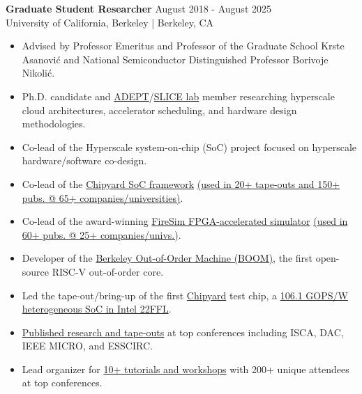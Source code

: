 \documentclass[line]{res}
\begin{document}
\begin{resume}
\textbf{Graduate Student Researcher} \hfill August 2018 - August 2025
\\
University of California, Berkeley | Berkeley, CA
\\
\vspace{-3mm}
\begin{itemize}
\item Advised by Professor Emeritus and Professor of the Graduate School Krste Asanovi\'c and National Semiconductor Distinguished Professor Borivoje Nikoli\'c.
\item Ph.D. candidate and \href{https://adept.eecs.berkeley.edu/}{ADEPT}/\href{https://slice.eecs.berkeley.edu/}{SLICE lab} member researching hyperscale cloud architectures, accelerator scheduling, and hardware design methodologies.
\item Co-lead of the Hyperscale system-on-chip (SoC) project focused on hyperscale hardware/software co-design.
\item Co-lead of the \href{https://github.com/ucb-bar/chipyard}{Chipyard SoC framework} \href{https://scholar.google.com/scholar?cites=4549882523608568335&as_sdt=2005&sciodt=0,5&hl=en}{(used in 20+ tape-outs and 150+ pubs. @ 65+ companies/universities)}.
\item Co-lead of the award-winning \href{https://fires.im/}{FireSim FPGA-accelerated simulator} \href{https://fires.im/publications/#userpapers}{(used in 60+ pubs. @ 25+ companies/univs.)}.
\item Developer of the \href{https://boom-core.org/}{Berkeley Out-of-Order Machine (BOOM)}, the first open-source RISC-V out-of-order core.
\item Led the tape-out/bring-up of the first \href{https://github.com/ucb-bar/chipyard}{Chipyard} test chip, a \href{https://ieeexplore.ieee.org/abstract/document/9567768}{106.1 GOPS/W heterogeneous SoC in Intel 22FFL}.
\item \href{https://scholar.google.com/citations?user=dsAQJ4cAAAAJ&hl=en}{Published research and tape-outs} at top conferences including ISCA, DAC, IEEE MICRO, and ESSCIRC.
\item Lead organizer for \href{https://fires.im/blog/}{10+ tutorials and workshops} with 200+ unique attendees at top conferences.
\end{itemize}

\vspace{-3mm}


\end{resume}
\end{document}

